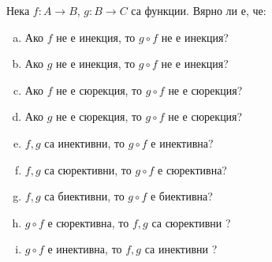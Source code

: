   






\begin{problem}
  Нека $f: A\to B$, $g: B\to C$ са функции.
  Вярно ли е, че:
  \begin{enumerate}[a)]
  \item 
    Ако $f$ не е инекция, то $g\circ f$ не е инекция?
  \item
    Ако $g$ не е инекция, то $g\circ f$ не е инекция?
  \item 
    Ако $f$ не е сюрекция, то $g\circ f$ не е сюрекция?
  \item
    Ако $g$ не е сюрекция, то $g\circ f$ не е сюрекция?
  \item
    $f,g$ са инективни, то $g\circ f$ е инективна?
  \item
    $f,g$ са сюрективни, то $g\circ f$ е сюрективна?
  \item
    $f,g$ са биективни, то $g\circ f$ е биективна?
  \item
    $g\circ f$ е сюрективна,  то $f,g$ са сюрективни ?
  \item
    $g\circ f$ е инективна, то $f,g$ са инективни ?
  \end{enumerate}
\end{problem}


